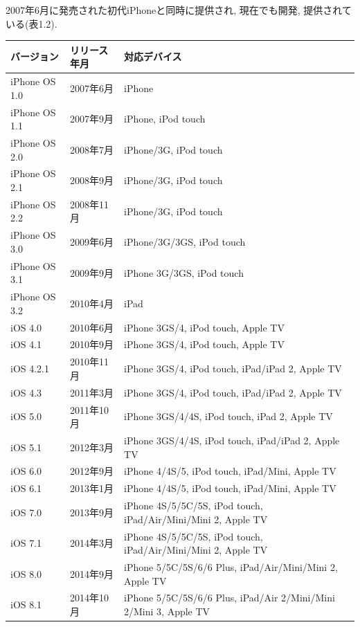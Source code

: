 2007年6月に発売された初代iPhoneと同時に提供され, 現在でも開発, 提供されている(表1.2).

\begin{table}[tb]
\begin{center}
\begin{tabular}{|l|l|p{10cm}|} \hline
バージョン & リリース年月 & 対応デバイス \\ \hline \hline
iPhone OS 1.0 & 2007年6月 & iPhone \\ \hline
iPhone OS 1.1 & 2007年9月 & iPhone, iPod touch \\ \hline
iPhone OS 2.0 & 2008年7月 & iPhone/3G, iPod touch \\ \hline
iPhone OS 2.1 & 2008年9月 & iPhone/3G, iPod touch \\ \hline
iPhone OS 2.2 & 2008年11月 & iPhone/3G, iPod touch \\ \hline
iPhone OS 3.0 & 2009年6月 & iPhone/3G/3GS, iPod touch \\ \hline
iPhone OS 3.1 & 2009年9月 & iPhone 3G/3GS, iPod touch \\ \hline
iPhone OS 3.2 & 2010年4月 & iPad \\ \hline
iOS 4.0 & 2010年6月 & iPhone 3GS/4, iPod touch, Apple TV \\ \hline
iOS 4.1 & 2010年9月 & iPhone 3GS/4, iPod touch, Apple TV \\ \hline
iOS 4.2.1 & 2010年11月 & iPhone 3GS/4, iPod touch, iPad/iPad 2, Apple TV \\ \hline
iOS 4.3 & 2011年3月 & iPhone 3GS/4, iPod touch, iPad/iPad 2, Apple TV \\ \hline
iOS 5.0 & 2011年10月 & iPhone 3GS/4/4S, iPod touch, iPad 2, Apple TV \\ \hline
iOS 5.1 & 2012年3月 & iPhone 3GS/4/4S, iPod touch, iPad/iPad 2, Apple TV \\ \hline
iOS 6.0 & 2012年9月 & iPhone 4/4S/5, iPod touch, iPad/Mini, Apple TV \\ \hline
iOS 6.1 & 2013年1月 & iPhone 4/4S/5, iPod touch, iPad/Mini, Apple TV \\ \hline
iOS 7.0 & 2013年9月 & iPhone 4S/5/5C/5S, iPod touch, iPad/Air/Mini/Mini 2, Apple TV \\ \hline
iOS 7.1 & 2014年3月 & iPhone 4S/5/5C/5S, iPod touch, iPad/Air/Mini/Mini 2, Apple TV \\ \hline
iOS 8.0 & 2014年9月 & iPhone 5/5C/5S/6/6 Plus, iPad/Air/Mini/Mini 2, Apple TV \\ \hline
iOS 8.1 & 2014年10月 & iPhone 5/5C/5S/6/6 Plus, iPad/Air 2/Mini/Mini 2/Mini 3, Apple TV \\ \hline

\end{tabular}
\end{center}
\end{table}
